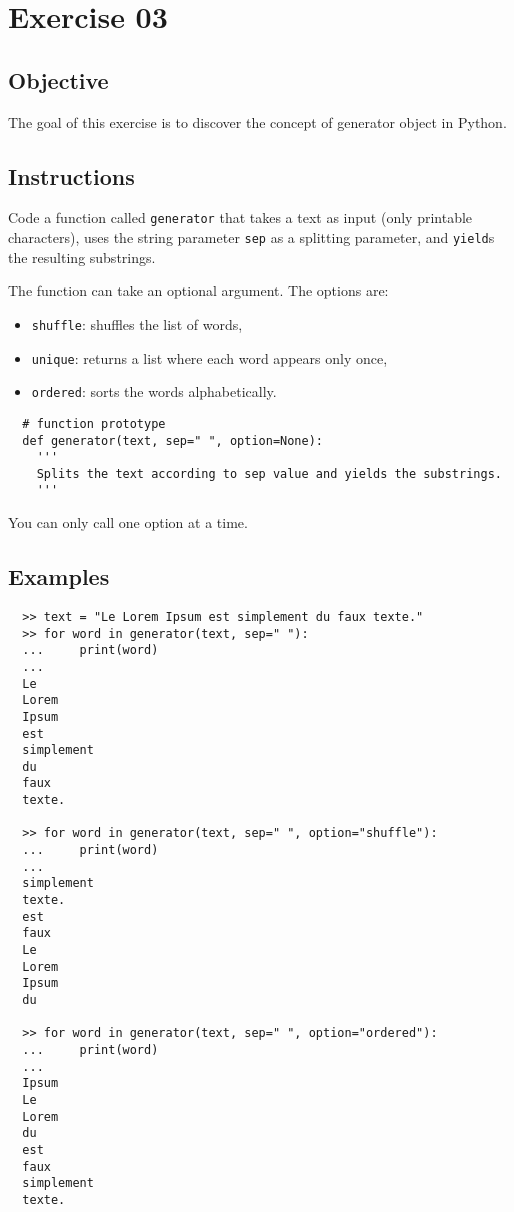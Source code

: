 \chapter{Exercise 03}
\makeheaderfilesforbidden


\section*{Objective}
The goal of this exercise is to discover the concept of generator object in Python.

\section*{Instructions}
Code a function called \texttt{generator} that takes a text as input (only printable characters), uses the string
parameter \texttt{sep} as a splitting parameter, and \texttt{yield}s the resulting substrings.

The function can take an optional argument.
The options are:
\begin{itemize}
  \item \texttt{shuffle}: shuffles the list of words,
  \item \texttt{unique}: returns a list where each word appears only once,
  \item \texttt{ordered}: sorts the words alphabetically.
\end{itemize}

\begin{verbatim}
  # function prototype
  def generator(text, sep=" ", option=None):
    '''
    Splits the text according to sep value and yields the substrings.
    '''
\end{verbatim}

You can only call one option at a time.

\section*{Examples}
\begin{verbatim}
  >> text = "Le Lorem Ipsum est simplement du faux texte."
  >> for word in generator(text, sep=" "):
  ...     print(word)
  ...
  Le
  Lorem
  Ipsum
  est
  simplement
  du
  faux
  texte.

  >> for word in generator(text, sep=" ", option="shuffle"):
  ...     print(word)
  ...
  simplement
  texte.
  est
  faux
  Le
  Lorem
  Ipsum
  du

  >> for word in generator(text, sep=" ", option="ordered"):
  ...     print(word)
  ...
  Ipsum
  Le
  Lorem
  du
  est
  faux
  simplement
  texte.
\end{verbatim}

